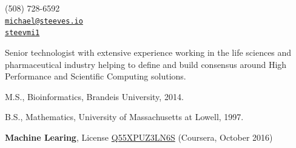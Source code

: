 \documentclass[11pt,article,oneside]{memoir}
\makeatletter
\def\myemail{michael@steeves.io}
\def\myphone{(508) 728-6592}
\def\mytwitter{@steevmi1}
\def\mygit{steevmi1}
\makeatother
\begin{document}
\begin{minipage}[t]{2.95in}

\end{minipage}
\hfill
\hfill
\begin{minipage}[t]{1.3in}
  \flushright \footnotesize  \addressblock \myphone \, \faPhone \\
  {\scriptsize  \texttt{\href{mailto:\myemail}{\myemail}} \, \faEnvelope} \\
  {\scriptsize  \texttt{\href{\mygit}{\mygit}} \, \faGithub}
\end{minipage}

\medskip

\reversemarginpar

\bigskip



\ind Senior technologist with extensive experience working in the life sciences and pharmaceutical industry helping to define and build consensus around High Performance and Scientific Computing solutions.

\bigskip




\ind M.S., Bioinformatics, Brandeis University, 2014.

\ind B.S., Mathematics, University of Massachusetts at Lowell, 1997.

\bigskip


\ind \textbf{Machine Learing}, License \href{https://www.coursera.org/account/accomplishments/verify/Q55XPUZ3LN6S}{Q55XPUZ3LN6S} (Coursera, October 2016)
\end{document}
